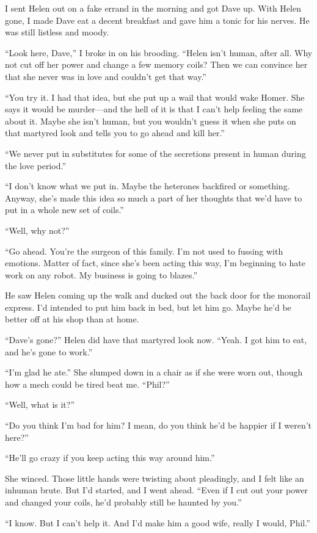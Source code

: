 \documentclass{article}
\begin{document}
I sent Helen out on a fake errand in the morning and got Dave up. With Helen gone, I made Dave eat a decent breakfast and gave him a tonic for his nerves. He was still listless and moody.

“Look here, Dave,” I broke in on his brooding. “Helen isn’t human, after all. Why not cut off her power and change a few memory coils? Then we can convince her that she never was in love and couldn’t get that way.”

“You try it. I had that idea, but she put up a wail that would wake Homer. She says it would be murder—and the hell of it is that I can’t help feeling the same about it. Maybe she isn’t human, but you wouldn’t guess it when she puts on that martyred look and tells you to go ahead and kill her.”

“We never put in substitutes for some of the secretions present in human during the love period.”

“I don’t know what we put in. Maybe the heterones backfired or something. Anyway, she’s made this idea so much a part of her thoughts that we’d have to put in a whole new set of coils.”

“Well, why not?”

“Go ahead. You’re the surgeon of this family. I’m not used to fussing with emotions. Matter of fact, since she’s been acting this way, I’m beginning to hate work on any robot. My business is going to blazes.”

He saw Helen coming up the walk and ducked out the back door for the monorail express. I’d intended to put him back in bed, but let him go. Maybe he’d be better off at his shop than at home.

“Dave’s gone?” Helen did have that martyred look now. “Yeah. I got him to eat, and he’s gone to work.”

“I’m glad he ate.” She slumped down in a chair as if she were worn out, though how a mech could be tired beat me. “Phil?”

“Well, what is it?”

“Do you think I’m bad for him? I mean, do you think he’d be happier if I weren’t here?”

“He’ll go crazy if you keep acting this way around him.”

She winced. Those little hands were twisting about pleadingly, and I felt like an inhuman brute. But I’d started, and I went ahead. “Even if I cut out your power and changed your coils, he’d probably still be haunted by you.”

“I know. But I can’t help it. And I’d make him a good wife, really I would, Phil.”
\end{document}
